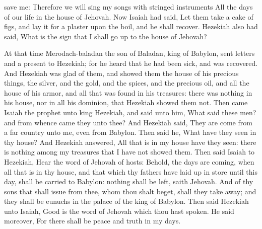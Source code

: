save me: Therefore we will sing my songs with stringed instruments All the days of our life in the house of Jehovah.  Now Isaiah had said, Let them take a cake of figs, and lay it for a plaster upon the boil, and he shall recover. Hezekiah also had said, What is the sign that I shall go up to the house of Jehovah? 

At that time Merodach-baladan the son of Baladan, king of Babylon, sent letters and a present to Hezekiah; for he heard that he had been sick, and was recovered. And Hezekiah was glad of them, and showed them the house of his precious things, the silver, and the gold, and the spices, and the precious oil, and all the house of his armor, and all that was found in his treasures: there was nothing in his house, nor in all his dominion, that Hezekiah showed them not. Then came Isaiah the prophet unto king Hezekiah, and said unto him, What said these men? and from whence came they unto thee? And Hezekiah said, They are come from a far country unto me, even from Babylon. Then said he, What have they seen in thy house? And Hezekiah answered, All that is in my house have they seen: there is nothing among my treasures that I have not showed them. Then said Isaiah to Hezekiah, Hear the word of Jehovah of hosts: Behold, the days are coming, when all that is in thy house, and that which thy fathers have laid up in store until this day, shall be carried to Babylon: nothing shall be left, saith Jehovah. And of thy sons that shall issue from thee, whom thou shalt beget, shall they take away; and they shall be eunuchs in the palace of the king of Babylon. Then said Hezekiah unto Isaiah, Good is the word of Jehovah which thou hast spoken. He said moreover, For there shall be peace and truth in my days. 

